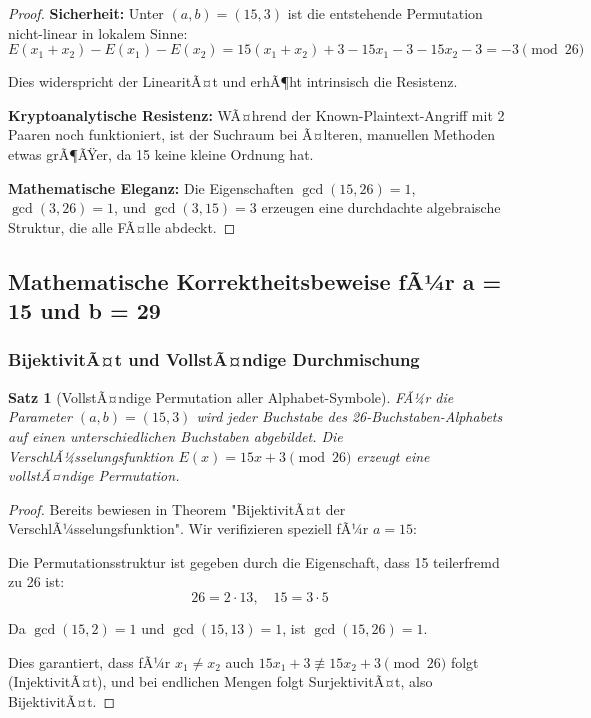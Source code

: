 ﻿\documentclass[12pt,a4paper]{article}
\newtheorem{theorem}{Satz}
\begin{document}
	\begin{proof}
		\textbf{Sicherheit:}
		Unter $(a, b) = (15, 3)$ ist die entstehende Permutation nicht-linear in lokalem Sinne:
		\begin{equation}
			E(x_1 + x_2) - E(x_1) - E(x_2) = 15(x_1 + x_2) + 3 - 15x_1 - 3 - 15x_2 - 3 = -3 \pmod{26}
		\end{equation}
		
		Dies widerspricht der LinearitÃ¤t und erhÃ¶ht intrinsisch die Resistenz.
		
		\textbf{Kryptoanalytische Resistenz:}
		WÃ¤hrend der Known-Plaintext-Angriff mit 2 Paaren noch funktioniert, ist der Suchraum bei Ã¤lteren, manuellen Methoden etwas grÃ¶ÃŸer, da 15 keine kleine Ordnung hat.
		
		\textbf{Mathematische Eleganz:}
		Die Eigenschaften $\gcd(15, 26) = 1$, $\gcd(3, 26) = 1$, und $\gcd(3, 15) = 3$ erzeugen eine durchdachte algebraische Struktur, die alle FÃ¤lle abdeckt.
	\end{proof}
	
	\subsection{Mathematische Korrektheitsbeweise fÃ¼r a = 15 und b = 29}
	
	\subsubsection{BijektivitÃ¤t und VollstÃ¤ndige Durchmischung}
	
	\begin{theorem}[VollstÃ¤ndige Permutation aller Alphabet-Symbole]
		FÃ¼r die Parameter $(a, b) = (15, 3)$ wird jeder Buchstabe des 26-Buchstaben-Alphabets auf einen unterschiedlichen Buchstaben abgebildet. Die VerschlÃ¼sselungsfunktion $E(x) = 15x + 3 \pmod{26}$ erzeugt eine vollstÃ¤ndige Permutation.
	\end{theorem}
	
	\begin{proof}
		Bereits bewiesen in Theorem "BijektivitÃ¤t der VerschlÃ¼sselungsfunktion". Wir verifizieren speziell fÃ¼r $a = 15$:
		
		Die Permutationsstruktur ist gegeben durch die Eigenschaft, dass 15 teilerfremd zu 26 ist:
		$$26 = 2 \cdot 13, \quad 15 = 3 \cdot 5$$
		
		Da $\gcd(15, 2) = 1$ und $\gcd(15, 13) = 1$, ist $\gcd(15, 26) = 1$.
		
		Dies garantiert, dass fÃ¼r $x_1 \neq x_2$ auch $15x_1 + 3 \not\equiv 15x_2 + 3 \pmod{26}$ folgt (InjektivitÃ¤t), und bei endlichen Mengen folgt SurjektivitÃ¤t, also BijektivitÃ¤t.
	\end{proof}
	
\end{document}
